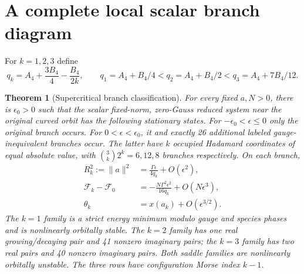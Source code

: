 \documentclass[11pt,a4paper]{article}
\newtheorem{theorem}{Theorem}\newtheorem{lemma}[theorem]{Lemma}\newtheorem{proposition}[theorem]{Proposition}
\begin{document}
\section{A complete local scalar branch diagram}
For $k=1,2,3$ define
\[
q_k=A_4+\frac{3B_4}{4}-\frac{B_4}{2k},\qquad
q_1=A_4+B_4/4<q_2=A_4+B_4/2<q_3=A_4+7B_4/12.
\]
\begin{theorem}[Supercritical branch classification]\label{th:branches}
For every fixed $a,N>0$, there is $\epsilon_0>0$ such that the scalar fixed-norm, zero-Gauss reduced system near the original curved orbit has the following stationary states.
For $-\epsilon_0<\epsilon\le0$ only the original branch occurs. For $0<\epsilon<\epsilon_0$, it and exactly 26 additional labeled gauge-inequivalent branches occur. The latter have $k$ occupied Hadamard coordinates of equal absolute value, with $\binom3k2^k=6,12,8$ branches respectively. On each branch,
\begin{align}
R_k^2:=\|a\|^2&=\frac{\Gamma\epsilon}{4q_k}+O(\epsilon^2),\label{eq:radius}\\
\mathcal F_k-\mathcal F_0&=-\frac{N\Gamma^2\epsilon^2}{16q_k}+O(N\epsilon^3),\label{eq:energy}\\
\theta_k&=x(a_k)+O(\epsilon^{3/2}).\nonumber
\end{align}
The $k=1$ family is a strict energy minimum modulo gauge and species phases and is nonlinearly orbitally stable. The $k=2$ family has one real growing/decaying pair and 41 nonzero imaginary pairs; the $k=3$ family has two real pairs and 40 nonzero imaginary pairs. Both saddle families are nonlinearly orbitally unstable. The three rows have configuration Morse index $k-1$.
\end{theorem}
\end{document}
